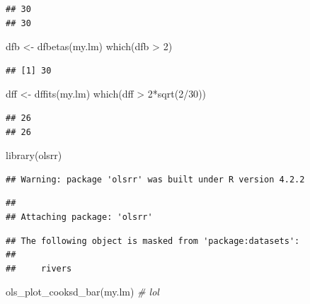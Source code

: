 \documentclass[
]{book}
\newenvironment{Shaded}{\begin{snugshade}}{\end{snugshade}}
\newcommand{\CommentTok}[1]{\textcolor[rgb]{0.56,0.35,0.01}{\textit{#1}}}
\newcommand{\DecValTok}[1]{\textcolor[rgb]{0.00,0.00,0.81}{#1}}
\newcommand{\FunctionTok}[1]{\textcolor[rgb]{0.00,0.00,0.00}{#1}}
\newcommand{\NormalTok}[1]{#1}
\newcommand{\OtherTok}[1]{\textcolor[rgb]{0.56,0.35,0.01}{#1}}
\newcommand{\SpecialCharTok}[1]{\textcolor[rgb]{0.00,0.00,0.00}{#1}}
\begin{document}
\begin{verbatim}
## 30 
## 30
\end{verbatim}

\begin{Shaded}
\begin{Highlighting}[]
\NormalTok{dfb }\OtherTok{\textless{}{-}} \FunctionTok{dfbetas}\NormalTok{(my.lm)}
\FunctionTok{which}\NormalTok{(dfb }\SpecialCharTok{\textgreater{}} \DecValTok{2}\NormalTok{)}
\end{Highlighting}
\end{Shaded}

\begin{verbatim}
## [1] 30
\end{verbatim}

\begin{Shaded}
\begin{Highlighting}[]
\NormalTok{dff }\OtherTok{\textless{}{-}} \FunctionTok{dffits}\NormalTok{(my.lm)}
\FunctionTok{which}\NormalTok{(dff }\SpecialCharTok{\textgreater{}} \DecValTok{2}\SpecialCharTok{*}\FunctionTok{sqrt}\NormalTok{(}\DecValTok{2}\SpecialCharTok{/}\DecValTok{30}\NormalTok{))}
\end{Highlighting}
\end{Shaded}

\begin{verbatim}
## 26 
## 26
\end{verbatim}

\begin{Shaded}
\begin{Highlighting}[]
\FunctionTok{library}\NormalTok{(olsrr)}
\end{Highlighting}
\end{Shaded}

\begin{verbatim}
## Warning: package 'olsrr' was built under R version 4.2.2
\end{verbatim}

\begin{verbatim}
## 
## Attaching package: 'olsrr'
\end{verbatim}

\begin{verbatim}
## The following object is masked from 'package:datasets':
## 
##     rivers
\end{verbatim}

\begin{Shaded}
\begin{Highlighting}[]
\FunctionTok{ols\_plot\_cooksd\_bar}\NormalTok{(my.lm)  }\CommentTok{\# lol}
\end{Highlighting}
\end{Shaded}
\end{document}
